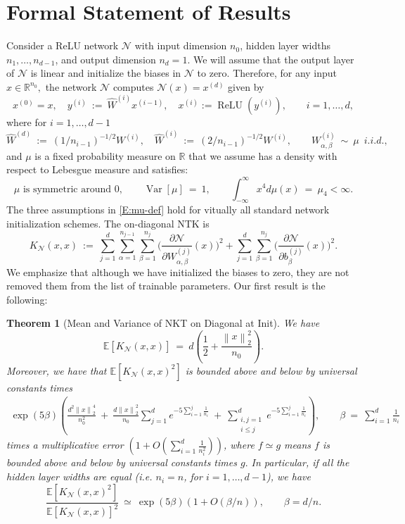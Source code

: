 \documentclass[11pt, reqno]{amsart}
\newtheorem{theorem}{Theorem}
\newcommand{\R}{{\mathbb R}}
\newcommand{\E}[1]{{\mathbb E}\left [#1\right]}
\newcommand{\lr}[1]{\ensuremath{\left(#1 \right)}}
\newcommand{\norm}[1]{\left\lVert#1\right\rVert}
\newcommand{\mN}{\mathcal N}
\DeclareMathOperator{\Relu}{ReLU}
\DeclareMathOperator{\Var}{Var}
\begin{document}
\section{Formal Statement of Results}\label{S:formal}
Consider a ReLU network $\mN$ with input dimension $n_0$, hidden layer widths $n_1,\ldots, n_{d-1}$, and output dimension $n_{d}=1$. We will assume that the output layer of $\mN$ is linear and initialize the biases in $\mN$ to zero. Therefore, for any input $x\in \R^{n_0},$ the network $\mN$ computes $\mN(x)=x^{(d)}$ given by
\begin{equation}\label{E:N-def}
x^{(0)}=x,\quad y^{(i)}~:=~\widehat{W}^{(i)}x^{(i-1)},\quad x^{(i)}:=\Relu(y^{(i)}),\qquad i=1,\ldots, d,
\end{equation}
where for $i=1,\ldots, d-1$
\begin{equation}\label{E:W-def}
\widehat{W}^{(d)}~:=~(1/n_{i-1})^{-1/2}W^{(i)},\quad \widehat{W}^{(i)}~:=~(2/n_{i-1})^{-1/2}W^{(i)},\qquad W_{\alpha,\beta}^{(i)}~\sim~\mu\,\,\,i.i.d.,
\end{equation}
and $\mu$ is a fixed probability measure on $\R$ that we assume has a density with respect to Lebesgue measure and satisfies:
\begin{equation}\label{E:mu-def}
\mu\text{ is symmetric around }0,\qquad \Var[\mu]~=~1,\qquad \int_{-\infty}^\infty x^4d\mu(x)~=~\mu_4<\infty.
\end{equation}
The three assumptions in \eqref{E:mu-def} hold for vitually all standard network initialization schemes. The on-diagonal NTK is
\begin{equation}\label{E:K-def}
K_{\mN}(x,x)~:=~\sum_{j=1}^d\sum_{\alpha=1}^{n_{j-1}}\sum_{\beta=1}^{n_j}
\bigg(\frac{\partial \mN}{\partial W_{\alpha,\beta}^{(j)}}(x)\bigg)^2+\sum_{j=1}^d \sum_{\beta=1}^{n_j}\bigg(\frac{\partial \mN}{\partial b_{\beta}^{(j)}}(x)\bigg)^2.
\end{equation}
We emphasize that although we have initialized the biases to zero, they are not removed them from the list of trainable parameters. Our first result is the following:
\begin{theorem}[Mean and Variance of NKT on Diagonal at Init]\label{T:NTK}
We have
\[\E{K_{\mN}(x,x)}~=~d\lr{\frac{1}{2}+\frac{\norm{x}_2^2}{n_0}}.\]
Moreover, we have that $\E{K_{\mN}(x,x)^2}$ is bounded above and below by universal constants times
\begin{align*}
\exp\lr{5\beta}\lr{\frac{d^2\norm{x}_2^4}{n_0^2}~+~ \frac{d\norm{x}_2^2}{n_0} \sum_{j=1}^d e^{-5 \sum_{i=1}^{j} \frac{1}{n_i}} ~+~\sum_{\substack{i,j=1\\ i\leq j}}^d e^{-5 \sum_{i=1}^{j} \frac{1}{n_i}}},\qquad \beta~=~\sum_{i=1}^{d}\frac{1}{n_i}
\end{align*}
times a multiplicative error $\lr{1+O\lr{\sum_{i=1}^d \frac{1}{n_i^2}}}$, where $f \simeq g$ means $f$ is bounded above and below by universal constants times $g.$ In particular, if all the hidden layer widths are equal (i.e. $n_i=n$, for $i=1,\ldots, d-1$), we have
\[\frac{\E{K_{\mN}(x,x)^2}}{\E{K_{\mN}(x,x)}^2}~\simeq~\exp\left(5\beta\right)\lr{1+O\lr{\beta/n}},\qquad \beta = d/n.\]
\end{theorem}
\end{document}

